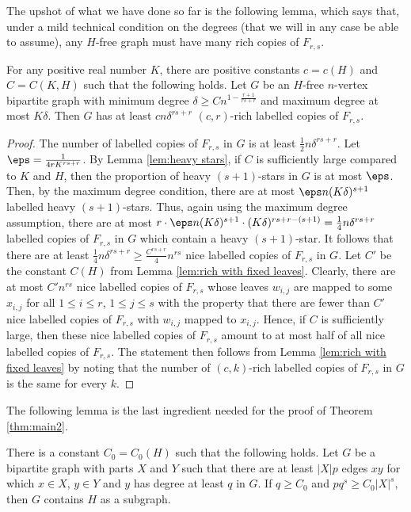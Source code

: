 The upshot of what we have done so far is the following lemma, which says that, under a mild technical condition on the degrees (that we will in any case be able to assume), any $H$-free graph must have many rich copies of $F_{r,s}$.

\begin{lemma} \label{lem:many rich}
	For any positive real number $K$, there are positive constants $c=c(H)$ and $C=C(K,H)$ such that the following holds. Let $G$ be an $H$-free $n$-vertex bipartite graph with minimum degree $\delta\geq Cn^{1-\frac{r+1}{rs+r}}$ and maximum degree at most $K\delta$. Then $G$ has at least $cn\delta^{rs+r}$ $(c,r)$-rich labelled copies of $F_{r,s}$.
\end{lemma}

\begin{proof}
	The number of labelled copies of $F_{r,s}$ in $G$ is at least $\frac{1}{2}n\delta^{rs+r}$. Let $\eps=\frac{1}{4rK^{rs+r}}$. By Lemma \ref{lem:heavy stars}, if $C$ is sufficiently large compared to $K$ and $H$, then the proportion of heavy $(s+1)$-stars in $G$ is at most $\eps$. Then, by the maximum degree condition, there are at most $\eps n(K\delta)^{s+1}$ labelled heavy $(s+1)$-stars. Thus, again using the maximum degree assumption, there are at most $r\cdot \eps n (K\delta)^{s+1}\cdot (K\delta)^{rs+r-(s+1)}=\frac{1}{4}n\delta^{rs+r}$ labelled copies of $F_{r,s}$ in $G$ which contain a heavy $(s+1)$-star. It follows that there are at least $\frac{1}{4}n\delta^{rs+r}\geq \frac{C^{rs+r}}{4}n^{rs}$ nice labelled copies of $F_{r,s}$ in $G$. Let $C'$ be the constant $C(H)$ from Lemma \ref{lem:rich with fixed leaves}. Clearly, there are at most $C'n^{rs}$ nice labelled copies of $F_{r,s}$ whose leaves $w_{i,j}$ are mapped to some $x_{i,j}$ for all $1\leq i\leq r$, $1\leq j\leq s$ with the property that there are fewer than $C'$ nice labelled copies of $F_{r,s}$ with $w_{i,j}$ mapped to $x_{i,j}$. Hence, if $C$ is sufficiently large, then these nice labelled copies of $F_{r,s}$ amount to at most half of all nice labelled copies of $F_{r,s}$. The statement then follows from Lemma \ref{lem:rich with fixed leaves} by noting that the number of $(c,k)$-rich labelled copies of $F_{r,s}$ in $G$ is the same for every $k$.
\end{proof}

The following lemma is the last ingredient needed for the proof of Theorem \ref{thm:main2}.

\begin{lemma} \label{lem:dependent random choice}
	There is a constant $C_0=C_0(H)$ such that the following holds. Let $G$ be a bipartite graph with parts $X$ and $Y$ such that there are at least $|X|p$ edges $xy$ for which $x\in X$, $y\in Y$ and $y$ has degree at least $q$ in $G$. If $q\geq C_0$ and $pq^s\geq C_0|X|^s$, then $G$ contains $H$ as a subgraph.
\end{lemma}

